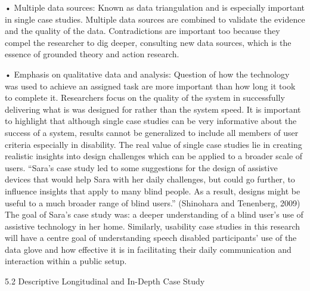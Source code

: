 •	Multiple data sources: Known as data triangulation and is especially important in single case studies. Multiple data sources are combined to validate the evidence and the quality of the data. Contradictions are important too because they compel the researcher to dig deeper, consulting new data sources, which is the essence of grounded theory and action research.

•	Emphasis on qualitative data and analysis: Question of how the technology was used to achieve an assigned task are more important than how long it took to complete it. Researchers focus on the quality of the system in successfully delivering what is was designed for rather than the system speed. 
It is important to highlight that although single case studies can be very informative about the success of a system, results cannot be generalized to include all members of user criteria especially in disability. The real value of single case studies lie in creating realistic insights into design challenges which can be applied to a broader scale of users. 
“Sara’s case study led to some suggestions for the design of assistive devices that would help Sara with her daily challenges, but could go further, to influence insights that apply to many blind people.  As a result, designs might be useful to a much broader range of blind users.” (Shinohara and Tenenberg, 2009)
The goal of Sara’s case study was: a deeper understanding of a blind user’s use of assistive technology in her home.  Similarly, usability case studies in this research will have a centre goal of understanding speech disabled participants’ use of the data glove and how effective it is in facilitating their daily communication and interaction within a public setup. 

5.2 Descriptive Longitudinal and In-Depth Case Study

